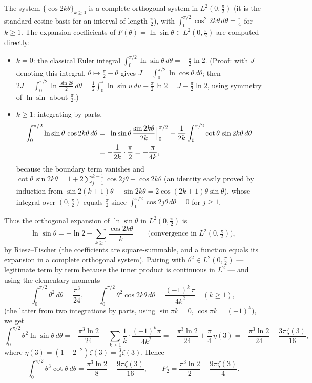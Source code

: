 \documentclass[11pt]{article}
\theoremstyle{remark}
\begin{document}
The system $\{\cos 2k\theta\}_{k\ge0}$ is a complete orthogonal system in $L^2(0,\tfrac\pi2)$ (it is the standard cosine basis for an interval of length $\tfrac\pi2$), with $\int_0^{\pi/2}\cos^2 2k\theta\,d\theta=\tfrac\pi4$ for $k\ge1$. The expansion coefficients of $F(\theta)=\ln\sin\theta\in L^2(0,\tfrac\pi2)$ are computed directly:

\begin{itemize}
\item $k=0$: the classical Euler integral $\int_0^{\pi/2}\ln\sin\theta\,d\theta=-\tfrac\pi2\ln2$. (Proof: with $J$ denoting this integral, $\theta\mapsto\tfrac\pi2-\theta$ gives $J=\int_0^{\pi/2}\ln\cos\theta\,d\theta$; then $2J=\int_0^{\pi/2}\ln\frac{\sin2\theta}{2}\,d\theta=\tfrac12\int_0^{\pi}\ln\sin u\,du-\tfrac\pi2\ln2=J-\tfrac\pi2\ln2$, using symmetry of $\ln\sin$ about $\tfrac\pi2$.)
\item $k\ge1$: integrating by parts,
\[
\begin{aligned}
\int_0^{\pi/2}\ln\sin\theta\,\cos2k\theta\,d\theta
&=\Bigl[\ln\sin\theta\,\frac{\sin2k\theta}{2k}\Bigr]_0^{\pi/2}-\frac{1}{2k}\int_0^{\pi/2}\cot\theta\,\sin2k\theta\,d\theta\\
&=-\frac{1}{2k}\cdot\frac{\pi}{2}=-\frac{\pi}{4k},
\end{aligned}
\]
because the boundary term vanishes and $\cot\theta\,\sin2k\theta=1+2\sum_{j=1}^{k-1}\cos2j\theta+\cos2k\theta$ (an identity easily proved by induction from $\sin2(k{+}1)\theta-\sin2k\theta=2\cos(2k{+}1)\theta\sin\theta$), whose integral over $(0,\tfrac\pi2)$ equals $\tfrac\pi2$ since $\int_0^{\pi/2}\cos2j\theta\,d\theta=0$ for $j\ge1$.
\end{itemize}

Thus the orthogonal expansion of $\ln\sin\theta$ in $L^2(0,\tfrac\pi2)$ is
\[
\ln\sin\theta=-\ln2-\sum_{k\ge1}\frac{\cos2k\theta}{k}\qquad\text{(convergence in }L^2(0,\tfrac\pi2)\text{)},
\]
by Riesz--Fischer (the coefficients are square-summable, and a function equals its expansion in a complete orthogonal system). Pairing with $\theta^2\in L^2(0,\tfrac\pi2)$ --- legitimate term by term because the inner product is continuous in $L^2$ --- and using the elementary moments
\[
\int_0^{\pi/2}\theta^2\,d\theta=\frac{\pi^3}{24},
\qquad
\int_0^{\pi/2}\theta^2\cos2k\theta\,d\theta=\frac{(-1)^k\,\pi}{4k^2}\quad(k\ge1),
\]
(the latter from two integrations by parts, using $\sin\pi k=0$, $\cos\pi k=(-1)^k$), we get
\[
\int_0^{\pi/2}\theta^2\ln\sin\theta\,d\theta
=-\frac{\pi^3\ln2}{24}-\sum_{k\ge1}\frac1k\cdot\frac{(-1)^k\pi}{4k^2}
=-\frac{\pi^3\ln2}{24}+\frac{\pi}{4}\,\eta(3)
=-\frac{\pi^3\ln2}{24}+\frac{3\pi\zeta(3)}{16},
\]
where $\eta(3)=(1-2^{-2})\zeta(3)=\tfrac34\zeta(3)$. Hence
\[
\int_0^{\pi/2}\theta^3\cot\theta\,d\theta=\frac{\pi^3\ln2}{8}-\frac{9\pi\zeta(3)}{16},
\qquad
P_2=\frac{\pi^3\ln2}{2}-\frac{9\pi\zeta(3)}{4}.
\]
\end{document}
